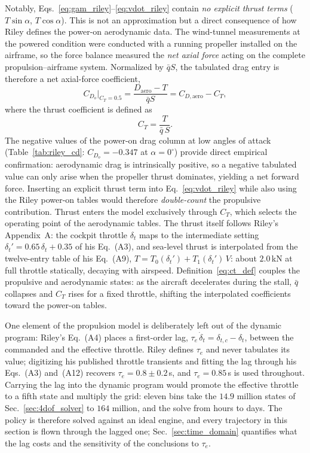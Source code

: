 \documentclass[journal ]{new-aiaa}
\begin{document}
Notably, Eqs.~\eqref{eq:gam_riley}--\eqref{eq:vdot_riley} contain
\emph{no explicit thrust terms} ($T\sin\alpha$, $T\cos\alpha$). This is
not an approximation but a direct consequence of how Riley
\cite{Riley1985} defines the power-on aerodynamic data. The wind-tunnel
measurements at the powered condition were conducted with a running
propeller installed on the airframe, so the force balance measured the
\textit{net axial force} acting on the complete propulsion--airframe
system. Normalized by $\bar{q}S$, the tabulated drag entry is therefore
a net axial-force coefficient,
\begin{equation}
    C_{D_o}\bigl|_{C_T=0.5} = \frac{D_\text{aero} - T}{\bar{q}S}
    = C_{D,\text{aero}} - C_T,
    \label{eq:cd_net}
\end{equation}
where the thrust coefficient is defined as
\begin{equation}
    C_T = \frac{T}{\bar{q}\, S}.
    \label{eq:ct_def}
\end{equation}
The negative values of the power-on drag column at low angles of attack
(Table~\ref{tab:riley_cd}: $C_{D_o} = -0.347$ at $\alpha = 0^\circ$)
provide direct empirical confirmation: aerodynamic drag is intrinsically
positive, so a negative tabulated value can only arise when the
propeller thrust dominates, yielding a net forward force. Inserting an
explicit thrust term into Eq.~\eqref{eq:vdot_riley} while also using the
Riley power-on tables would therefore \textit{double-count} the
propulsive contribution. Thrust enters the model exclusively through
$C_T$, which selects the operating point of the aerodynamic tables.
The thrust itself follows Riley's Appendix~A: the cockpit throttle $\delta_t$
maps to the intermediate setting
$\delta_t' = 0.65\,\delta_t + 0.35$ of his Eq.~(A3), and sea-level
thrust is interpolated from the twelve-entry table of his Eq.~(A9),
$T = T_0(\delta_t') + T_1(\delta_t')\,V$: about $2.0$\,kN at full
throttle statically, decaying with airspeed.
Definition~\eqref{eq:ct_def} couples the
propulsive and aerodynamic states: as the aircraft decelerates during
the stall, $\bar{q}$ collapses and $C_T$ rises for a fixed throttle,
shifting the interpolated coefficients toward the power-on tables.

One element of the propulsion model is deliberately left out of the
dynamic program: Riley's Eq.~(A4) places a first-order lag,
$\tau_e\, \dot{\delta}_t = \delta_{t,c} - \delta_t$, between the
commanded and the effective throttle. Riley defines $\tau_e$ and
never tabulates its value; digitizing his published throttle
transients and fitting the lag through his Eqs.~(A3) and~(A12)
recovers $\tau_e = 0.8 \pm 0.2$\,s, and $\tau_e = 0.85$\,s is used
throughout. Carrying the lag into the dynamic program would promote
the effective throttle to a fifth state and multiply the grid:
eleven bins take the $14.9$ million states of
Sec.~\ref{sec:4dof_solver} to $164$ million, and the solve from
hours to days. The policy is therefore solved against an ideal
engine, and every trajectory in this section is flown through the
lagged one; Sec.~\ref{sec:time_domain} quantifies what the lag
costs and the sensitivity of the conclusions to $\tau_e$.
\end{document}
